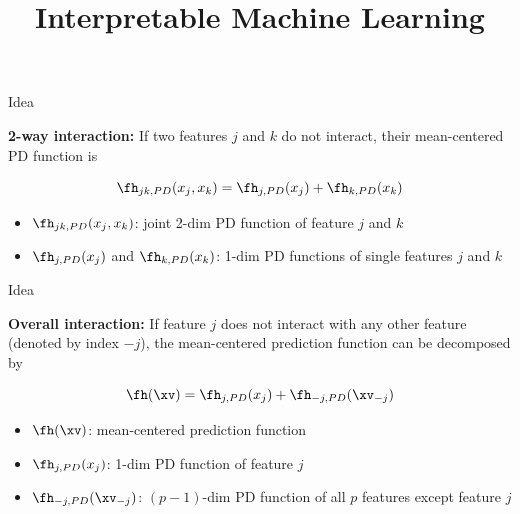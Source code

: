 \documentclass[11pt,compress,t,notes=noshow, aspectratio=169, xcolor=table]{beamer}
\title{Interpretable Machine Learning}
\date{}
\begin{document}
\newcommand{\titlefigure}{figure/h-statistic}
\newcommand{\learninggoals}{
\item Understand Friedman's H-statistic
\item Measure general $k$-way interactions between arbitrary features
\item Measure a feature's overall interaction strength
}


\begin{frame}{Idea }

    \textbf{2-way interaction:} If two features $j$ and $k$ do not interact, their mean-centered PD function is

	$$\fh_{jk, PD}(x_j, x_k) = \fh_{j, PD}(x_j) + \fh_{k, PD}(x_k)$$

\begin{itemize}
	\item $\fh_{jk, PD}(x_j, x_k)$: joint 2-dim PD function of feature $j$ and $k$
	\item $\fh_{j, PD}(x_j)$ and $\fh_{k, PD}(x_k)$: 1-dim PD functions of single features $j$ and $k$
\end{itemize}

\end{frame}
\begin{frame}{Idea}

	\textbf{Overall interaction:} If feature $j$ does not interact with any other feature (denoted by index $-j$), the mean-centered prediction function can be decomposed by

	$$\fh(\xv) = \fh_{j, PD}(x_j) +  \fh_{-j, PD}(\xv_{-j})$$

\begin{itemize}
	\item $\fh(\xv)$: mean-centered prediction function
	\item $\fh_{j, PD}(x_j)$: 1-dim PD function of feature $j$
	\item $\fh_{-j, PD}(\xv_{-j})$: $(p-1)$-dim PD function of all $p$ features except feature $j$
\end{itemize}
\end{frame}
\end{document}
